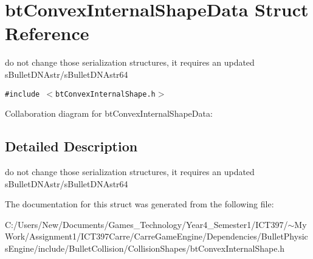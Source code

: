\hypertarget{structbt_convex_internal_shape_data}{
\section{btConvexInternalShapeData Struct Reference}
\label{structbt_convex_internal_shape_data}
}
do not change those serialization structures, it requires an updated sBulletDNAstr/sBulletDNAstr64  


{\tt \#include $<$btConvexInternalShape.h$>$}

Collaboration diagram for btConvexInternalShapeData:

\subsection{Detailed Description}
do not change those serialization structures, it requires an updated sBulletDNAstr/sBulletDNAstr64 

The documentation for this struct was generated from the following file:\begin{CompactItemize}
\item 
C:/Users/New/Documents/Games\_\-Technology/Year4\_\-Semester1/ICT397/$\sim$My Work/Assignment1/ICT397Carre/CarreGameEngine/Dependencies/BulletPhysicsEngine/include/BulletCollision/CollisionShapes/btConvexInternalShape.h\end{CompactItemize}
